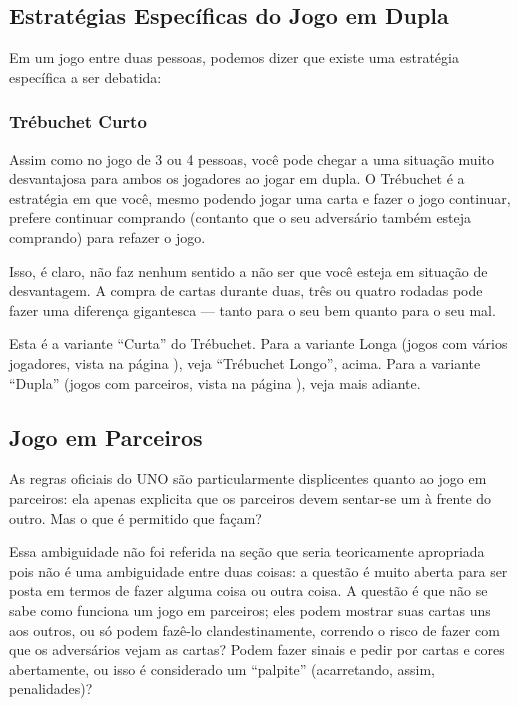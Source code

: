 \subsection{Estratégias Específicas do Jogo em Dupla}

Em um jogo entre duas pessoas, podemos dizer que existe uma estratégia específica a ser debatida:

\subsubsection{Trébuchet Curto}

\label{trebuchetcurto}

Assim como no jogo de 3 ou 4 pessoas, você pode chegar a uma situação muito desvantajosa para ambos os jogadores ao jogar em dupla. O Trébuchet é a estratégia em que você, mesmo podendo jogar uma carta e fazer o jogo continuar, prefere continuar comprando (contanto que o seu adversário também esteja comprando) para refazer o jogo.

Isso, é claro, não faz nenhum sentido a não ser que você esteja em situação de desvantagem. A compra de cartas durante duas, três ou quatro rodadas pode fazer uma diferença gigantesca --- tanto para o seu bem quanto para o seu mal.

Esta é a variante ``Curta'' do Trébuchet. Para a variante Longa (jogos com vários jogadores, vista na página \pageref{trebuchetlongo}), veja ``Trébuchet Longo'', acima. Para a variante ``Dupla'' (jogos com parceiros, vista na página \pageref{trebuchetduplo}), veja mais adiante.

\subsection{Jogo em Parceiros}

\label{jogoemparceiros}

As regras oficiais do UNO são particularmente displicentes quanto ao jogo em parceiros: ela apenas explicita que os parceiros devem sentar-se um à frente do outro. Mas o que é permitido que façam?

Essa ambiguidade não foi referida na seção que seria teoricamente apropriada pois não é uma ambiguidade entre duas coisas: a questão é muito aberta para ser posta em termos de fazer alguma coisa ou outra coisa. A questão é que não se sabe como funciona um jogo em parceiros; eles podem mostrar suas cartas uns aos outros, ou só podem fazê-lo clandestinamente, correndo o risco de fazer com que os adversários vejam as cartas? Podem fazer sinais e pedir por cartas e cores abertamente, ou isso é considerado um ``palpite'' (acarretando, assim, penalidades)?

